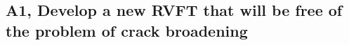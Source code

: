 \documentclass[10pt,letterpaper]{article}
\begin{document}

  \subsection{A1, Develop a  new RVFT that will be free of the problem of crack broadening}
    \label{s:A1}
\end{document}
